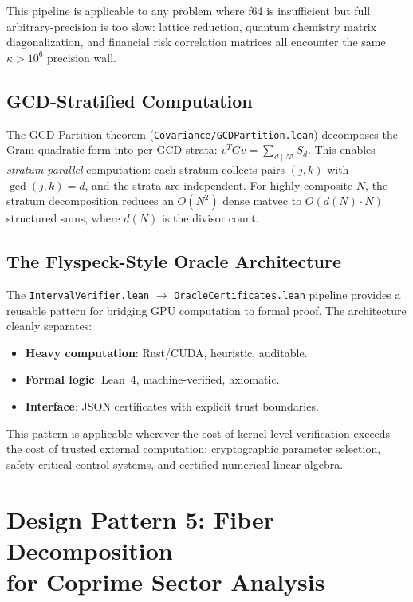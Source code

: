 \documentclass[11pt,a4paper]{article}
\begin{document}
This pipeline is applicable to any problem where f64 is insufficient
but full arbitrary-precision is too slow: lattice reduction, quantum
chemistry matrix diagonalization, and financial risk correlation
matrices all encounter the same $\kappa > 10^6$ precision wall.

\subsection{GCD-Stratified Computation}

The GCD Partition theorem (\texttt{Covariance/GCDPartition.lean})
decomposes the Gram quadratic form into per-GCD strata:
$v^T G v = \sum_{d \mid N!} S_d$.
This enables \emph{stratum-parallel} computation: each stratum
collects pairs $(j,k)$ with $\gcd(j,k) = d$, and the strata are
independent. For highly composite $N$, the stratum decomposition
reduces an $O(N^2)$ dense matvec to $O(d(N) \cdot N)$ structured
sums, where $d(N)$ is the divisor count.

\subsection{The Flyspeck-Style Oracle Architecture}

The \texttt{IntervalVerifier.lean} $\to$ \texttt{OracleCertificates.lean}
pipeline provides a reusable pattern for bridging GPU computation to
formal proof. The architecture cleanly separates:
\begin{itemize}
  \item \textbf{Heavy computation}: Rust/CUDA, heuristic, auditable.
  \item \textbf{Formal logic}: Lean~4, machine-verified, axiomatic.
  \item \textbf{Interface}: JSON certificates with explicit trust
    boundaries.
\end{itemize}
This pattern is applicable wherever the cost of kernel-level
verification exceeds the cost of trusted external computation:
cryptographic parameter selection, safety-critical control systems,
and certified numerical linear algebra.

\section{Design Pattern 5: Fiber Decomposition\\
  for Coprime Sector Analysis}
\label{sec:fiber}
\end{document}
